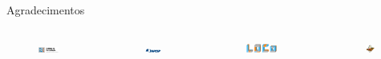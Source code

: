 \documentclass[10pt]{beamer}
\begin{document}
\begin{frame}{Agradecimentos}
    \begin{columns}[t]
        \begin{figure}
            \centering
            \includegraphics[width=0.8\textwidth]{images/logo_ic.png}
        \end{figure}
        \vspace{3em}
        \begin{figure}
            \centering
            \includegraphics[width=0.8\textwidth]{images/fapesp.png}
        \end{figure}
        \begin{figure}
            \centering
            \includegraphics[width=0.8\textwidth]{images/logo_loco.png}
        \end{figure}
        \begin{figure}
            \centering
            \includegraphics[width=0.7\textwidth]{images/onpce.png}
        \end{figure}
    \end{columns}
\end{frame}
\end{document}
